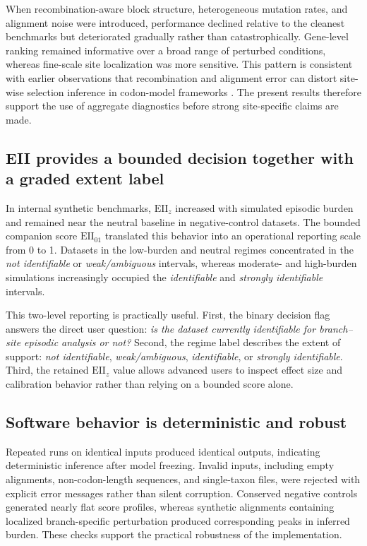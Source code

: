 \documentclass[11pt]{article}
\begin{document}
When recombination-aware block structure, heterogeneous mutation rates, and alignment noise were introduced, performance declined relative to the cleanest benchmarks but deteriorated gradually rather than catastrophically. Gene-level ranking remained informative over a broad range of perturbed conditions, whereas fine-scale site localization was more sensitive. This pattern is consistent with earlier observations that recombination and alignment error can distort site-wise selection inference in codon-model frameworks \cite{Anisimova2003,FletcherYang2010,JordanGoldman2012}. The present results therefore support the use of aggregate diagnostics before strong site-specific claims are made.

\subsection{EII provides a bounded decision together with a graded extent label}

In internal synthetic benchmarks, $\mathrm{EII}_{z}$ increased with simulated episodic burden and remained near the neutral baseline in negative-control datasets. The bounded companion score $\mathrm{EII}_{01}$ translated this behavior into an operational reporting scale from 0 to 1. Datasets in the low-burden and neutral regimes concentrated in the \emph{not identifiable} or \emph{weak/ambiguous} intervals, whereas moderate- and high-burden simulations increasingly occupied the \emph{identifiable} and \emph{strongly identifiable} intervals.

This two-level reporting is practically useful. First, the binary decision flag answers the direct user question: \emph{is the dataset currently identifiable for branch--site episodic analysis or not?} Second, the regime label describes the extent of support: \emph{not identifiable}, \emph{weak/ambiguous}, \emph{identifiable}, or \emph{strongly identifiable}. Third, the retained $\mathrm{EII}_{z}$ value allows advanced users to inspect effect size and calibration behavior rather than relying on a bounded score alone.

\subsection{Software behavior is deterministic and robust}

Repeated runs on identical inputs produced identical outputs, indicating deterministic inference after model freezing. Invalid inputs, including empty alignments, non-codon-length sequences, and single-taxon files, were rejected with explicit error messages rather than silent corruption. Conserved negative controls generated nearly flat score profiles, whereas synthetic alignments containing localized branch-specific perturbation produced corresponding peaks in inferred burden. These checks support the practical robustness of the implementation.
\end{document}
